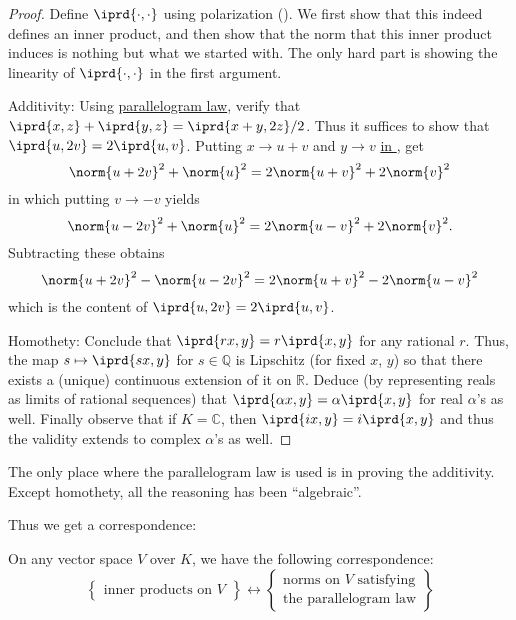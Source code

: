 	\begin{proof}
		Define $\iprd{\cdot, \cdot}$ using polarization (). We first show that this indeed defines an inner product, and then show that the norm that this inner product induces is nothing but what we started with. The only hard part is showing the linearity of $\iprd{\cdot, \cdot}$ in the first argument.
		
		Additivity: Using \uline{parallelogram law}, verify that $\iprd{x, z} + \iprd{y, z} = \iprd{x + y, 2z}/2$. Thus it suffices to show that $\iprd{u, 2v} = 2\iprd{u, v}$. Putting $x\to u + v$ and $y\to v$ \uline{in \mbox{}}, get
		\[
		\norm{u + 2v}^2 + \norm{u}^2 = 2\norm{u + v}^2 + 2\norm{v}^2
		\]
		in which putting $v\to -v$ yields
		\[
		\norm{u - 2v}^2 + \norm{u}^2 = 2\norm{u - v}^2 + 2\norm{v}^2\text.
		\]
		Subtracting these obtains
		\[
		\norm{u + 2v}^2 - \norm{u - 2v}^2 = 2\norm{u + v}^2 - 2\norm{u - v}^2
		\]
		which is the content of $\iprd{u, 2v} = 2\iprd{u, v}$.
		
		Homothety: Conclude that $\iprd{rx, y} = r\iprd{x, y}$ for any rational $r$. Thus, the map $s\mapsto \iprd{sx, y}$ for $s\in\mathbb Q$ is Lipschitz (for fixed $x$, $y$) so that there exists a (unique) continuous extension of it on $\mathbb R$. Deduce (by representing reals as limits of rational sequences) that $\iprd{\alpha x, y} = \alpha\iprd{x, y}$ for real $\alpha$'s as well. Finally observe that if $K = \mathbb C$, then $\iprd{ix, y} = i\iprd{x, y}$ and thus the validity extends to complex $\alpha$'s as well.
	\end{proof}
	
	\begin{rmk}
		The only place where the parallelogram law is used is in proving the additivity. Except homothety, all the reasoning has been ``algebraic''.
	\end{rmk}
	
	Thus we get a correspondence:
	
	\begin{cor}
		On any vector space $V$ over $K$, we have the following correspondence:
		\[
		\left\{ 
		\begin{gathered}
			\text{inner products on $V$}
		\end{gathered}
		\right\}
		\longleftrightarrow
		\left\{
		\begin{gathered}
			\text{norms on $V$ satisfying}\\
			\text{the parallelogram law}
		\end{gathered}
		\right\}
		\]
	\end{cor}
	
